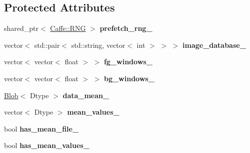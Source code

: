 \subsection*{Protected Attributes}
\begin{DoxyCompactItemize}
\item 
shared\+\_\+ptr$<$ \hyperlink{classcaffe_1_1Caffe_1_1RNG}{Caffe\+::\+R\+NG} $>$ {\bfseries prefetch\+\_\+rng\+\_\+}\hypertarget{classcaffe_1_1WindowDataLayer_afa989509237083d73a6e77935883587b}{}\label{classcaffe_1_1WindowDataLayer_afa989509237083d73a6e77935883587b}

\item 
vector$<$ std\+::pair$<$ std\+::string, vector$<$ int $>$ $>$ $>$ {\bfseries image\+\_\+database\+\_\+}\hypertarget{classcaffe_1_1WindowDataLayer_a6b2fa458b81345ca8a65f8b473584ea8}{}\label{classcaffe_1_1WindowDataLayer_a6b2fa458b81345ca8a65f8b473584ea8}

\item 
vector$<$ vector$<$ float $>$ $>$ {\bfseries fg\+\_\+windows\+\_\+}\hypertarget{classcaffe_1_1WindowDataLayer_ac78c9c3671b5116a432c221ebd2c656f}{}\label{classcaffe_1_1WindowDataLayer_ac78c9c3671b5116a432c221ebd2c656f}

\item 
vector$<$ vector$<$ float $>$ $>$ {\bfseries bg\+\_\+windows\+\_\+}\hypertarget{classcaffe_1_1WindowDataLayer_a9b25a230a66e8d289f02c2d872fc816c}{}\label{classcaffe_1_1WindowDataLayer_a9b25a230a66e8d289f02c2d872fc816c}

\item 
\hyperlink{classcaffe_1_1Blob}{Blob}$<$ Dtype $>$ {\bfseries data\+\_\+mean\+\_\+}\hypertarget{classcaffe_1_1WindowDataLayer_a35f69e1d231f036c4a1718eb89ade23f}{}\label{classcaffe_1_1WindowDataLayer_a35f69e1d231f036c4a1718eb89ade23f}

\item 
vector$<$ Dtype $>$ {\bfseries mean\+\_\+values\+\_\+}\hypertarget{classcaffe_1_1WindowDataLayer_a541c0c2fafc2edb2f92af054de9f5b0e}{}\label{classcaffe_1_1WindowDataLayer_a541c0c2fafc2edb2f92af054de9f5b0e}

\item 
bool {\bfseries has\+\_\+mean\+\_\+file\+\_\+}\hypertarget{classcaffe_1_1WindowDataLayer_a9a7d659a86e8edefc559dd5583403c83}{}\label{classcaffe_1_1WindowDataLayer_a9a7d659a86e8edefc559dd5583403c83}

\item 
bool {\bfseries has\+\_\+mean\+\_\+values\+\_\+}\hypertarget{classcaffe_1_1WindowDataLayer_a20f111cf16f037ce270d69c0601ee17f}{}\label{classcaffe_1_1WindowDataLayer_a20f111cf16f037ce270d69c0601ee17f}


\end{DoxyCompactItemize}
